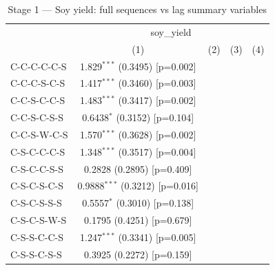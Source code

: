 
\begin{table}[H]
   \caption{\label{tab:soy_jp_mean} Stage 1 — Soy yield: full sequences vs lag summary variables}
   \bigskip
   \centering
   \begin{tabular}{lcccc}
      \toprule
       & \multicolumn{4}{c}{soy\_yield}\\
                                      & (1)                     & (2)                      & (3)                      & (4)\\  
      \midrule 
      C-C-C-C-C-S                     & 1.829$^{***}$ (0.3495) [p=0.002]  &                          &                          &   \\   
      C-C-C-S-C-S                     & 1.417$^{***}$ (0.3460) [p=0.003]  &                          &                          &   \\   
      C-C-S-C-C-S                     & 1.483$^{***}$ (0.3417) [p=0.002]  &                          &                          &   \\   
      C-C-S-C-S-S                     & 0.6438$^{*}$ (0.3152) [p=0.104]   &                          &                          &   \\   
      C-C-S-W-C-S                     & 1.570$^{***}$ (0.3628) [p=0.002]  &                          &                          &   \\   
      C-S-C-C-C-S                     & 1.348$^{***}$ (0.3517) [p=0.004]  &                          &                          &   \\   
      C-S-C-C-S-S                     & 0.2828 (0.2895) [p=0.409]         &                          &                          &   \\   
      C-S-C-S-C-S                     & 0.9888$^{***}$ (0.3212) [p=0.016] &                          &                          &   \\   
      C-S-C-S-S-S                     & 0.5557$^{*}$ (0.3010) [p=0.138]   &                          &                          &   \\   
      C-S-C-S-W-S                     & 0.1795 (0.4251) [p=0.679]         &                          &                          &   \\   
      C-S-S-C-C-S                     & 1.247$^{***}$ (0.3341) [p=0.005]  &                          &                          &   \\   
      C-S-S-C-S-S                     & 0.3925 (0.2272) [p=0.159]         &                          &                          &   \\   

\end{tabular}
\end{table}
